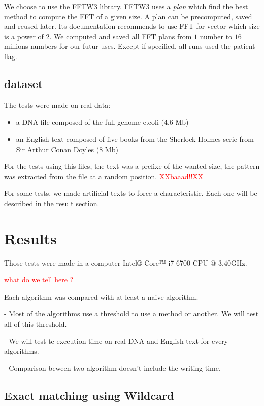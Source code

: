 \documentclass[preprint,12pt]{elsarticle}
\begin{document}
We choose to use the FFTW3 library.
FFTW3 uses a \textit{plan} which find the best method to compute the FFT of a given size.
A plan can be precomputed, saved and reused later.
Its documentation recommends to use FFT for vector which size is a power of $2$.
We computed and saved all FFT plans from $1$ number to $16$ millions numbers for our futur uses.
Except if specified, all runs used the patient flag.


\subsection{dataset}

The tests were made on real data:
\begin{itemize}
\setlength\itemsep{0.1em}
\item a DNA file composed of the full genome e.coli (4.6 Mb)
\item an English text composed of five books from the Sherlock Holmes serie from Sir Arthur Conan Doyles (8 Mb)
\end{itemize}
For the tests using this files, the text was a prefixe of the wanted size, 
the pattern was extracted from the file at a random position. \textcolor{red}{XXbaaad!!XX}

For some tests, we made artificial texts to force a characteristic.
Each one will be described in the result section.




\section{Results}
\label{Res}

Those tests were made in a computer Intel® Core™ i7-6700 CPU @ $3.40$GHz.

\textcolor{red}{what do we tell here ?}

Each algorithm was compared with at least a naive algorithm.


- Most of the algorithms use a threshold to use a method or another. We will test all of this threshold.

- We will test te execution time on real DNA and English text for every algorithms.

- Comparison beween two algorithm doesn't include the writing time.



\subsection{Exact matching using Wildcard}
\label{WCTests}
\end{document}
